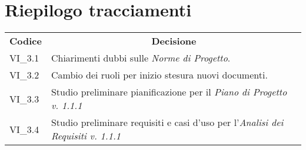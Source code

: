
\section{Riepilogo tracciamenti}
\begin{longtable} {
		>{\centering}p{17mm} 
		>{}p{120mm}}
	\rowcolor{gray!50}
	\textbf{Codice} & \multicolumn{1}{c}{\textbf{Decisione}} \\%
	VI\_3.1 & Chiarimenti dubbi sulle \textit{Norme di Progetto}. \TBstrut \\ [2mm]
	VI\_3.2 & Cambio dei ruoli per inizio stesura nuovi documenti. \TBstrut \\ [2mm]
	VI\_3.3 & Studio preliminare pianificazione per il \textit{Piano di Progetto v. 1.1.1} \TBstrut \\ [2mm]
	VI\_3.4 & Studio preliminare requisiti e casi d'uso per l'\textit{Analisi dei Requisiti v. 1.1.1} \TBstrut \\ [2mm]
	
\end{longtable}